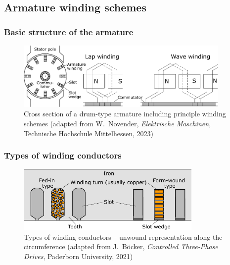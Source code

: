 \subsection{Armature winding schemes}

\begin{frame}
	\frametitle{Basic structure of the armature}
    \begin{figure}
        \centering
        \includegraphics[width=0.925\textwidth]{fig/lec03/Armature_slots.pdf}
        \caption{Cross section of a drum-type armature including principle winding schemes (adapted from W.~Novender, \textit{Elektrische Maschinen}, Technische Hochschule Mittelhessen, 2023)}
    \end{figure}
\end{frame}

\begin{frame}
	\frametitle{Types of winding conductors}
    \begin{figure}
        \centering
        \includegraphics[width=0.8\textwidth]{fig/lec03/Winding_turn_types.pdf}
        \caption{Types of winding conductors -- unwound representation along the circumference (adapted from J.~B\"ocker, \textit{Controlled Three-Phase Drives}, Paderborn University, 2021)}
    \end{figure}
\end{frame}

